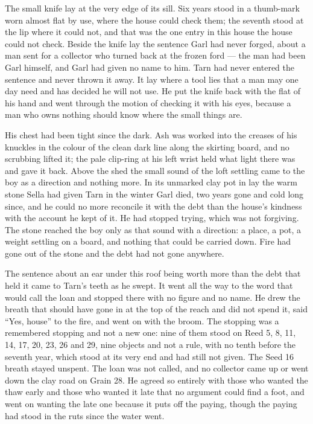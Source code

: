 The small knife lay at the very edge of its sill. Six years stood in a thumb-mark worn almost flat by use, where the house could check them; the seventh stood at the lip where it could not, and that was the one entry in this house the house could not check. Beside the knife lay the sentence Garl had never forged, about a man sent for a collector who turned back at the frozen ford — the man had been Garl himself, and Garl had given no name to him. Tarn had never entered the sentence and never thrown it away. It lay where a tool lies that a man may one day need and has decided he will not use. He put the knife back with the flat of his hand and went through the motion of checking it with his eyes, because a man who owns nothing should know where the small things are.

His chest had been tight since the dark. Ash was worked into the creases of his knuckles in the colour of the clean dark line along the skirting board, and no scrubbing lifted it; the pale clip-ring at his left wrist held what light there was and gave it back. Above the shed the small sound of the loft settling came to the boy as a direction and nothing more. In its unmarked clay pot in  lay the warm stone Sella had given Tarn in the winter Garl died, two years gone and cold long since, and he could no more reconcile it with the debt than the house's kindness with the account he kept of it. He had stopped trying, which was not forgiving. The stone reached the boy only as that sound with a direction: a place, a pot, a weight settling on a board, and nothing that could be carried down. Fire had gone out of the stone and the debt had not gone anywhere.

The sentence about an ear under this roof being worth more than the debt that held it came to Tarn's teeth as he swept. It went all the way to the word that would call the loan and stopped there with no figure and no name. He drew the breath that should have gone in at the top of the reach and did not spend it, said “Yes, house” to the fire, and went on with the broom. The stopping was a remembered stopping and not a new one: nine of them stood on Reed 5, 8, 11, 14, 17, 20, 23, 26 and 29, nine objects and not a rule, with no tenth before the seventh year, which stood at its very end and had still not given. The Seed 16 breath stayed unspent. The loan was not called, and no collector came up or went down the clay road on Grain 28. He agreed so entirely with those who wanted the thaw early and those who wanted it late that no argument could find a foot, and went on wanting the late one because it puts off the paying, though the paying had stood in the ruts since the water went.

